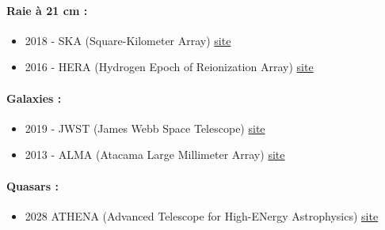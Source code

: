 \paragraph{Raie à 21 cm :} %
\begin{itemize}
\item 2018 - SKA (Square-Kilometer Array) \href{https://skatelescope.org/}{site} 
\item 2016 - HERA (Hydrogen Epoch of Reionization Array) \href{http://reionization.org/}{site}
\end{itemize}

\paragraph{Galaxies :}

\begin{itemize}
\item 2019 - JWST (James Webb Space Telescope) \href{https://www.jwst.nasa.gov/}{site}
\item 2013 - ALMA (Atacama Large Millimeter Array) \href{http://www.eso.org/public/teles-instr/alma/}{site}
\end{itemize}

\paragraph{Quasars :}
\begin{itemize}
\item 2028 ATHENA (Advanced Telescope for High-ENergy Astrophysics)  \href{https://athena.cnes.fr/}{site}
\end{itemize}


%


%
%

